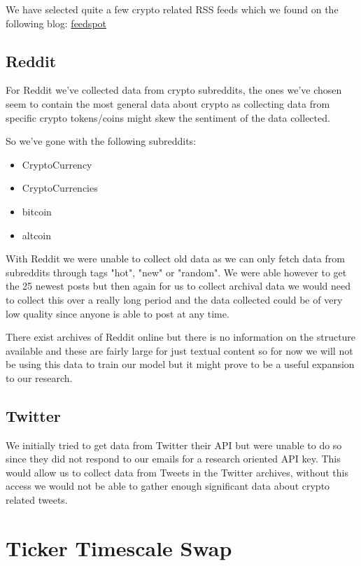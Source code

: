 \documentclass[12pt,a4paper]{article}
\begin{document}
We have selected quite a few crypto related RSS feeds which we found on the following blog: \href{https://blog.feedspot.com/cryptocurrency_rss_feeds/}{feedspot}

\subsection{Reddit}

For Reddit we've collected data from crypto subreddits, the ones we've chosen seem to contain the most general data about crypto as collecting data from specific crypto tokens/coins might skew the sentiment of the data collected.

So we've gone with the following subreddits:
\begin{itemize}
\item CryptoCurrency
\item CryptoCurrencies
\item bitcoin
\item altcoin
\end{itemize}
With Reddit we were unable to collect old data as we can only fetch data from subreddits through tags "hot", "new" or "random". We were able however to get the 25 newest posts but then again for us to collect archival data we would need to collect this over a really long period and the data collected could be of very low quality since anyone is able to post at any time.

There exist archives of Reddit online but there is no information on the structure available and these are fairly large for just textual content so for now we will not be using this data to train our model but it might prove to be a useful expansion to our research.

\subsection{Twitter}

We initially tried to get data from Twitter their API but were unable to do so since they did not respond to our emails for a research oriented API key. 
This would allow us to collect data from Tweets in the Twitter archives, without this access we would not be able to gather enough significant data about crypto related tweets.

\section{Ticker Timescale Swap}
\end{document}

